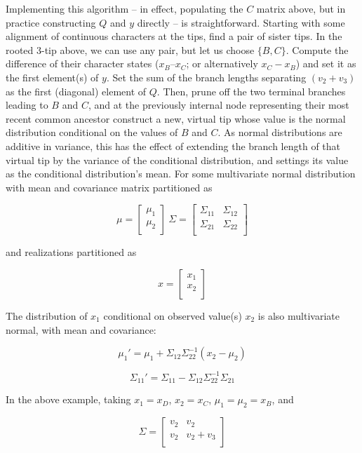 \documentclass[10pt, twocolumn, twoside]{article}
\begin{document}
Implementing this algorithm – in effect, populating the $C$ matrix above, but in practice constructing $Q$ and $y$ directly – is straightforward. Starting with some alignment of continuous characters at the tips, find a pair of sister tips. In the rooted 3-tip above, we can use any pair, but let us choose $\{B,C\}$. Compute the difference of their character states ($x_B – x_C$; or alternatively $x_C - x_B$) and set it as the first element(s) of $y$. Set the sum of the branch lengths separating $(v_2 + v_3)$ as the first (diagonal) element of $Q$. Then, prune off the two terminal branches leading to $B$ and $C$, and at the previously internal node representing their most recent common ancestor construct a new, virtual tip whose value is the normal distribution conditional on the values of $B$ and $C$. As normal distributions are additive in variance, this has the effect of extending the branch length of that virtual tip by the variance of the conditional distribution, and settings its value as the conditional distribution’s mean. For some multivariate normal distribution with mean and covariance matrix partitioned as

{\large\[\mu = \begin{bmatrix}
\mu_1 \\
\mu_2 \\
\end{bmatrix} \
\Sigma = \begin{bmatrix}
\Sigma_{11} & \Sigma_{12}\\
\Sigma_{21} & \Sigma_{22}\\
\end{bmatrix}
\]}

and realizations partitioned as

{\large\[x = \begin{bmatrix}
x_1 \\
x_2 \\
\end{bmatrix}\]}

The distribution of $x_1$ conditional on observed value(s) $x_2$ is also multivariate normal, with mean and covariance:

{\large\[\mu_1' = \mu_1 + \Sigma_{12}\Sigma_{22}^{-1}(x_2-\mu_2)\]}

{\large\[\Sigma_{11}' = \Sigma_{11} - \Sigma_{12}\Sigma_{22}^{-1}\Sigma_{21}\]}

In the above example, taking $x_1 = x_D$, $x_2 = x_C$, $\mu_1 = \mu_2 = x_B$, and

{\large\[\Sigma = \begin{bmatrix}
v_2 & v_2\\
v_2 & v_2+v_3\\
\end{bmatrix}\]}
\end{document}

